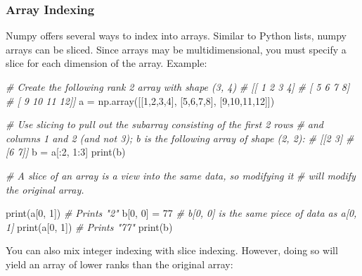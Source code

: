 \documentclass[
]{article}
\newenvironment{Shaded}{}{}
\newcommand{\BuiltInTok}[1]{#1}
\newcommand{\CommentTok}[1]{\textcolor[rgb]{0.38,0.63,0.69}{\textit{#1}}}
\newcommand{\DecValTok}[1]{\textcolor[rgb]{0.25,0.63,0.44}{#1}}
\newcommand{\NormalTok}[1]{#1}
\newcommand{\OperatorTok}[1]{\textcolor[rgb]{0.40,0.40,0.40}{#1}}
\begin{document}
\hypertarget{array-indexing}{%
\subsubsection{Array Indexing}\label{array-indexing}}

Numpy offers several ways to index into arrays. Similar to Python lists,
numpy arrays can be sliced. Since arrays may be multidimensional, you
must specify a slice for each dimension of the array. Example:

\begin{Shaded}
\begin{Highlighting}[]
\CommentTok{\# Create the following rank 2 array with shape (3, 4)}
\CommentTok{\# [[ 1  2  3  4]}
\CommentTok{\#  [ 5  6  7  8]}
\CommentTok{\#  [ 9 10 11 12]]}
\NormalTok{a }\OperatorTok{=}\NormalTok{ np.array([[}\DecValTok{1}\NormalTok{,}\DecValTok{2}\NormalTok{,}\DecValTok{3}\NormalTok{,}\DecValTok{4}\NormalTok{], }
\NormalTok{              [}\DecValTok{5}\NormalTok{,}\DecValTok{6}\NormalTok{,}\DecValTok{7}\NormalTok{,}\DecValTok{8}\NormalTok{], }
\NormalTok{              [}\DecValTok{9}\NormalTok{,}\DecValTok{10}\NormalTok{,}\DecValTok{11}\NormalTok{,}\DecValTok{12}\NormalTok{]])}

\CommentTok{\# Use slicing to pull out the subarray consisting of the first 2 rows}
\CommentTok{\# and columns 1 and 2 (and not 3); b is the following array of shape (2, 2):}
\CommentTok{\# [[2 3]}
\CommentTok{\#  [6 7]]}
\NormalTok{b }\OperatorTok{=}\NormalTok{ a[:}\DecValTok{2}\NormalTok{, }\DecValTok{1}\NormalTok{:}\DecValTok{3}\NormalTok{]}
\BuiltInTok{print}\NormalTok{(b)}

\CommentTok{\# A slice of an array is a view into the same data, so modifying it}
\CommentTok{\# will modify the original array.}

\BuiltInTok{print}\NormalTok{(a[}\DecValTok{0}\NormalTok{, }\DecValTok{1}\NormalTok{])   }\CommentTok{\# Prints "2"}
\NormalTok{b[}\DecValTok{0}\NormalTok{, }\DecValTok{0}\NormalTok{] }\OperatorTok{=} \DecValTok{77}     \CommentTok{\# b[0, 0] is the same piece of data as a[0, 1]}
\BuiltInTok{print}\NormalTok{(a[}\DecValTok{0}\NormalTok{, }\DecValTok{1}\NormalTok{])   }\CommentTok{\# Prints "77"}
\BuiltInTok{print}\NormalTok{(b)}
\end{Highlighting}
\end{Shaded}

You can also mix integer indexing with slice indexing. However, doing so
will yield an array of lower ranks than the original array:
\end{document}

